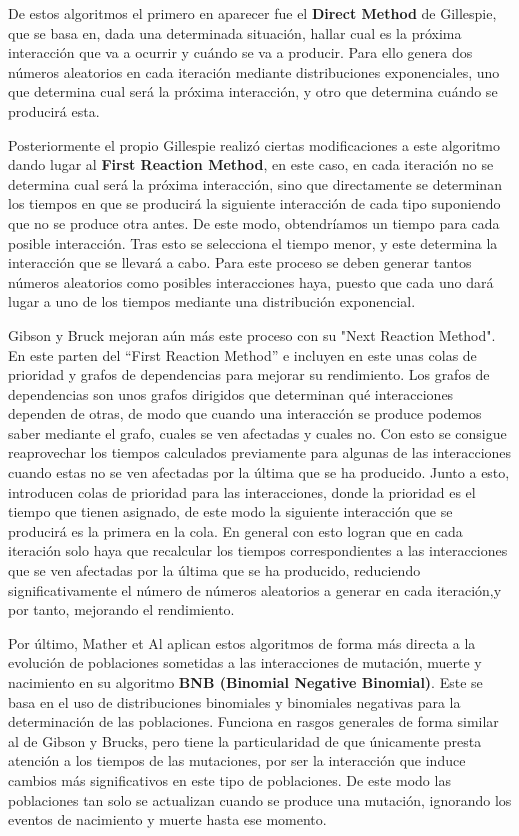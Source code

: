 De estos algoritmos el primero en aparecer fue el \textbf{Direct Method} de Gillespie\cite{Gillespie}, que se basa en, dada una determinada situación, hallar cual es la próxima interacción que va a ocurrir y cuándo se va a producir. Para ello genera dos números aleatorios en cada iteración mediante distribuciones exponenciales, uno que determina cual será la próxima interacción, y otro que determina cuándo se producirá esta.

Posteriormente el propio Gillespie\cite{Gillespie} realizó ciertas modificaciones a este algoritmo dando lugar al \textbf{First Reaction Method}, en este caso, en cada iteración no se determina cual será la próxima interacción, sino que directamente se determinan los tiempos en que se producirá la siguiente interacción de cada tipo suponiendo que no se produce otra antes. De este modo, obtendríamos un tiempo para cada posible interacción. Tras esto se selecciona el tiempo menor, y este determina la interacción que se llevará a cabo. Para este proceso se deben generar tantos números aleatorios como posibles interacciones haya, puesto que cada uno dará lugar a uno de los tiempos mediante una distribución exponencial. 

Gibson y Bruck mejoran aún más este proceso con su "Next Reaction Method"\cite{Gibson}. En este parten del ``First Reaction Method'' e incluyen en este unas colas de prioridad y grafos de dependencias para mejorar su rendimiento. Los grafos de dependencias son unos grafos dirigidos que determinan qué interacciones dependen de otras, de modo que cuando una interacción se produce podemos saber mediante el grafo, cuales se ven afectadas y cuales no. Con esto se consigue reaprovechar los tiempos calculados previamente para algunas de las interacciones cuando estas no se ven afectadas por la última que se ha producido. Junto a esto, introducen colas de prioridad para las interacciones, donde la prioridad es el tiempo que tienen asignado, de este modo la siguiente interacción que se producirá es la primera en la cola. En general con esto logran que en cada iteración solo haya que recalcular los tiempos correspondientes a las interacciones que se ven afectadas por la última que se ha producido, reduciendo significativamente el número de números aleatorios a generar en cada iteración,y por tanto, mejorando el rendimiento. 

Por último, Mather et Al aplican estos algoritmos de forma más directa a la evolución de poblaciones sometidas a las interacciones de mutación, muerte y nacimiento en su algoritmo \textbf{BNB (Binomial Negative Binomial)}\cite{Mather}. Este se basa en el uso de distribuciones binomiales y binomiales negativas para la determinación de las poblaciones. Funciona en rasgos generales de forma similar al de Gibson y Brucks, pero tiene la particularidad de que únicamente presta atención a los tiempos de las mutaciones, por ser la interacción que induce cambios más significativos en este tipo de poblaciones. De este modo las poblaciones tan solo se actualizan cuando se produce una mutación, ignorando los eventos de nacimiento y muerte hasta ese momento.

